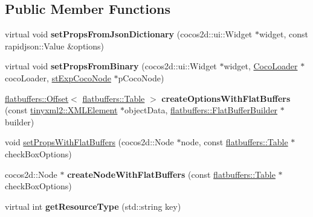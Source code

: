 \subsection*{Public Member Functions}
\begin{DoxyCompactItemize}
\item 
\mbox{\label{classcocostudio_1_1CheckBoxReader_a57dbaccdbbe96ea3668ea1b6dd67299b}} 
virtual void {\bfseries set\+Props\+From\+Json\+Dictionary} (cocos2d\+::ui\+::\+Widget $\ast$widget, const rapidjson\+::\+Value \&options)
\item 
\mbox{\label{classcocostudio_1_1CheckBoxReader_a95d284f6afe52f15f490fbe4e3399d88}} 
virtual void {\bfseries set\+Props\+From\+Binary} (cocos2d\+::ui\+::\+Widget $\ast$widget, \hyperlink{classcocostudio_1_1CocoLoader}{Coco\+Loader} $\ast$coco\+Loader, \hyperlink{structcocostudio_1_1stExpCocoNode}{st\+Exp\+Coco\+Node} $\ast$p\+Coco\+Node)
\item 
\mbox{\label{classcocostudio_1_1CheckBoxReader_a29020188aaa174f93d221875d88cc99e}} 
\hyperlink{structflatbuffers_1_1Offset}{flatbuffers\+::\+Offset}$<$ \hyperlink{classflatbuffers_1_1Table}{flatbuffers\+::\+Table} $>$ {\bfseries create\+Options\+With\+Flat\+Buffers} (const \hyperlink{classtinyxml2_1_1XMLElement}{tinyxml2\+::\+X\+M\+L\+Element} $\ast$object\+Data, \hyperlink{classflatbuffers_1_1FlatBufferBuilder}{flatbuffers\+::\+Flat\+Buffer\+Builder} $\ast$builder)
\item 
void \hyperlink{classcocostudio_1_1CheckBoxReader_a1c752818b327639a92eac6df9a852405}{set\+Props\+With\+Flat\+Buffers} (cocos2d\+::\+Node $\ast$node, const \hyperlink{classflatbuffers_1_1Table}{flatbuffers\+::\+Table} $\ast$check\+Box\+Options)
\item 
\mbox{\label{classcocostudio_1_1CheckBoxReader_a741a44c90dea91a3491ba003a4b1a155}} 
cocos2d\+::\+Node $\ast$ {\bfseries create\+Node\+With\+Flat\+Buffers} (const \hyperlink{classflatbuffers_1_1Table}{flatbuffers\+::\+Table} $\ast$check\+Box\+Options)
\item 
\mbox{\label{classcocostudio_1_1CheckBoxReader_a7640968dc843376046598b272cfd0e15}} 
virtual int {\bfseries get\+Resource\+Type} (std\+::string key)

\end{DoxyCompactItemize}
